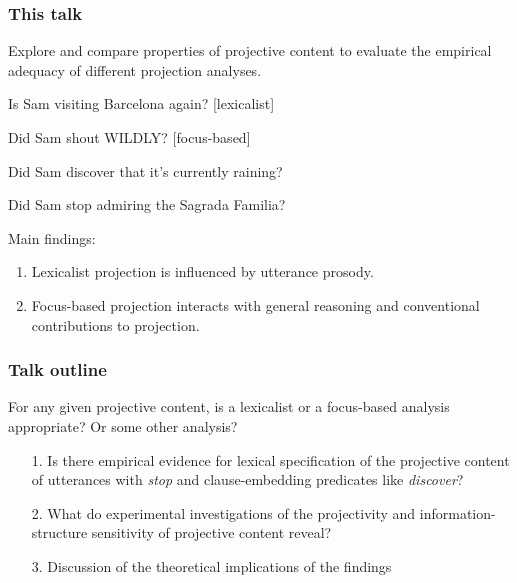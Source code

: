 \documentclass[pdf,xcolor=table,envcountsect,handout]{beamer}
\begin{document}
\begin{frame}
\frametitle{This talk}


Explore and compare properties of projective content to evaluate the empirical adequacy of different projection analyses.

\pause
\vspace*{-.3cm}

\begin{exe}
 Is Sam visiting Barcelona again? \hfill [lexicalist]

 Did Sam shout WILDLY? \hfill [focus-based]

 Did Sam discover that it's currently raining?

 Did Sam stop admiring the Sagrada Familia?

\end{exe}

\medskip
\pause

Main findings: 

\vspace*{-.3cm}

\begin{enumerate}[itemsep=-1pt]

\item Lexicalist projection is influenced by utterance prosody. 

\item Focus-based projection interacts with general reasoning and conventional contributions to projection.

\end{enumerate}

\hspace*{1cm} 

\end{frame}

\begin{frame}
\frametitle{Talk outline}

For any given projective content, is a lexicalist or a focus-based analysis appropriate? Or some other analysis?

\begin{itemize}

\item[1.] Is there empirical evidence for lexical specification of the projective content of utterances with {\em stop} and clause-embedding predicates like {\em discover}?

\bigskip

\item[2.] What do experimental investigations of the projectivity and information-structure sensitivity of projective content reveal? 

\bigskip

\item[3.] Discussion of the theoretical implications of the findings

\end{itemize}

\end{frame}
\end{document}
